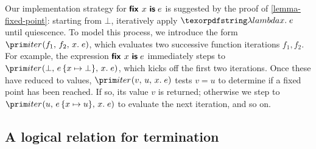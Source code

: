 Our implementation strategy for $\textsf{\bfseries fix}_{}~{x}~\textsf{\bfseries is}\;{e}$ is suggested by the proof of
\cref{lemma-fixed-point}: starting from $\bot$, iteratively apply $\fnof x e$
until quiescence. To model this process, we introduce the form
$\eiter{f_1}{f_2}{x}{e}$, which evaluates two successive function iterations
$f_1,f_2$.
%
For example, the expression $\textsf{\bfseries fix}_{}~{x}~\textsf{\bfseries is}\;{e}$ immediately steps to
$\eiter{\bot}{\subone{e}{x}{\bot}}{x}{e}$, which kicks off the first two
iterations.
%
Once these have reduced to values, $\eiter v u x e$ tests $v = u$ to determine
if a fixed point has been reached. If so, its value $v$ is returned; otherwise
we step to $\eiter{u}{\subone e x u}{x}{e}$ to evaluate the next iteration, and
so on.

\subsection{A logical relation for termination}

